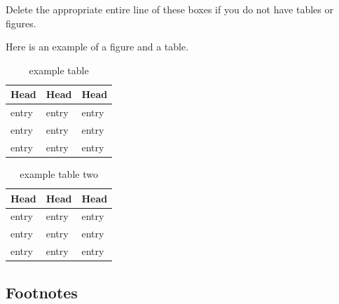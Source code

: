 Delete the appropriate entire line of these boxes if you do not have tables
or figures.

Here is an example of a figure and a table.

\begin{center}
\begin{table}[tbp] \centering%
\begin{tabular}{|l|l|l|}
\hline
\textbf{Head} & \textbf{Head} & \textbf{Head} \\ \hline
entry & entry & entry \\ 
entry & entry & entry \\ 
entry & entry & entry \\ \hline
\end{tabular}%
\caption{example table\label{key}}%
\end{table}%
\end{center}


\begin{center}
\begin{table}[tbp] \centering%
\begin{tabular}{|l|l|l|}
\hline
\textbf{Head} & \textbf{Head} & \textbf{Head} \\ \hline
entry & entry & entry \\ 
entry & entry & entry \\ 
entry & entry & entry \\ \hline
\end{tabular}%
\caption{example table two\label{key}}%
\end{table}%
\end{center}

\subsection{Footnotes}


